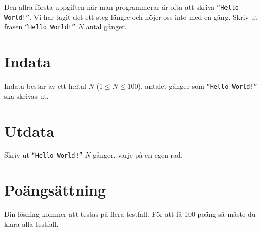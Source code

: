 Den allra första uppgiften när man programmerar är ofta att skriva \texttt{``Hello World!''}. Vi har tagit
det ett steg längre och nöjer oss inte med en gång. Skriv ut frasen \texttt{``Hello World!''} $N$ antal gånger.

\section*{Indata}
Indata består av ett heltal $N$ ($1 \leq N \leq 100$), antalet gånger som \texttt{``Hello World!''} ska
skrivas ut.

\section*{Utdata}
Skriv ut \texttt{``Hello World!''} $N$ gånger, varje på en egen rad.

\section*{Poängsättning}
Din lösning kommer att testas på flera testfall. För att få 100 poäng så måste du klara alla testfall.
